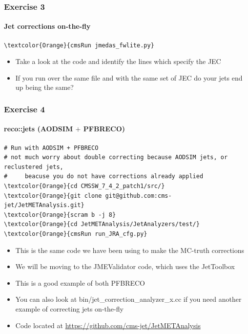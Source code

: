 \begin{frame}[fragile]
	\frametitle{Exercise 3}
	\framesubtitle{Jet corrections on-the-fly}

\begin{Verbatim}[label={Exercise 3}]
\textcolor{Orange}{cmsRun jmedas_fwlite.py}
\end{Verbatim}

\begin{block}{}
	\begin{itemize}
		\item Take a look at the code and identify the lines which specify the JEC
		\item If you run over the same file and with the same set of JEC do your jets end up being the same?
	\end{itemize}
\end{block}

\end{frame}

\begin{frame}[fragile]
	\frametitle{Exercise 4}
	\framesubtitle{reco::jets (AODSIM $+$ PFBRECO)}

\begin{Verbatim}[label={Exercise 4}]
# Run with AODSIM + PFBRECO
# not much worry about double correcting because AODSIM jets, or reclustered jets,
#     beacuse you do not have corrections already applied
\textcolor{Orange}{cd CMSSW_7_4_2_patch1/src/}
\textcolor{Orange}{git clone git@github.com:cms-jet/JetMETAnalysis.git}
\textcolor{Orange}{scram b -j 8}
\textcolor{Orange}{cd JetMETAnalysis/JetAnalyzers/test/}
\textcolor{Orange}{cmsRun run_JRA_cfg.py}
\end{Verbatim}

\begin{block}{}
	\begin{itemize}
		\item This is the same code we have been using to make the MC-truth corrections
		\item We will be moving to the JMEValidator code, which uses the JetToolbox
		\item This is a good example of both PFBRECO
		\item You can also look at bin/jet\_correction\_analyzer\_x.cc if you need another example of correcting jets on-the-fly
		\item Code located at \href{https://github.com/cms-jet/JetMETAnalysis}{https://github.com/cms-jet/JetMETAnalysis}
	\end{itemize}
\end{block}

\end{frame}

